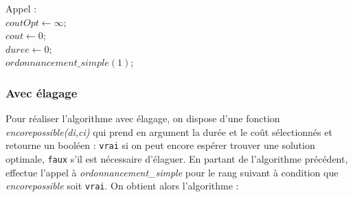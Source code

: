 \documentclass[a4paper, titlepage]{article}
\begin{document}
			\noindent
			Appel :\\
			$coutOpt \leftarrow \infty;$ \\
			$cout \leftarrow 0;$ \\
			$duree \leftarrow 0;$ \\
			$ordonnancement\_simple(1)$;

		\subsubsection{Avec élagage}

			Pour réaliser l'algorithme avec élagage, on dispose d'une fonction \emph{encorepossible(di,ci)} qui prend en argument la durée et le coût sélectionnés et retourne un booléen :
			\texttt{vrai} si on peut encore espérer trouver une solution optimale, \texttt{faux} s'il est nécessaire d'élaguer.
			En partant de l'algorithme précédent, effectue l'appel à \emph{ordonnancement\_simple} pour le rang suivant à condition que \emph{encorepossible} soit \texttt{vrai}.
			On obtient alors l'algorithme :
\end{document}
